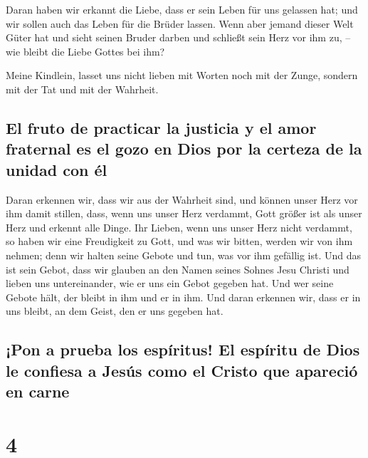  Daran haben wir erkannt die Liebe, dass er sein Leben
für uns gelassen hat; und wir sollen auch das Leben für die Brüder
lassen.  Wenn aber jemand dieser Welt Güter hat und sieht
seinen Bruder darben und schließt sein Herz vor ihm zu, -- wie bleibt
die Liebe Gottes bei ihm?

 Meine Kindlein, lasset uns nicht lieben mit Worten noch
mit der Zunge, sondern mit der Tat und mit der Wahrheit.

\hypertarget{el-fruto-de-practicar-la-justicia-y-el-amor-fraternal-es-el-gozo-en-dios-por-la-certeza-de-la-unidad-con-uxe9l}{%
\subsection{El fruto de practicar la justicia y el amor fraternal es el
gozo en Dios por la certeza de la unidad con
él}\label{el-fruto-de-practicar-la-justicia-y-el-amor-fraternal-es-el-gozo-en-dios-por-la-certeza-de-la-unidad-con-uxe9l}}

 Daran erkennen wir, dass wir aus der Wahrheit sind, und
können unser Herz vor ihm damit stillen,  dass, wenn uns
unser Herz verdammt, Gott größer ist als unser Herz und erkennt alle
Dinge.  Ihr Lieben, wenn uns unser Herz nicht verdammt,
so haben wir eine Freudigkeit zu Gott,  und was wir
bitten, werden wir von ihm nehmen; denn wir halten seine Gebote und tun,
was vor ihm gefällig ist.  Und das ist sein Gebot, dass
wir glauben an den Namen seines Sohnes Jesu Christi und lieben uns
untereinander, wie er uns ein Gebot gegeben hat.  Und wer
seine Gebote hält, der bleibt in ihm und er in ihm. Und daran erkennen
wir, dass er in uns bleibt, an dem Geist, den er uns gegeben hat.

\hypertarget{pon-a-prueba-los-espuxedritus-el-espuxedritu-de-dios-le-confiesa-a-jesuxfas-como-el-cristo-que-apareciuxf3-en-carne}{%
\subsection{¡Pon a prueba los espíritus! El espíritu de Dios le confiesa
a Jesús como el Cristo que apareció en
carne}\label{pon-a-prueba-los-espuxedritus-el-espuxedritu-de-dios-le-confiesa-a-jesuxfas-como-el-cristo-que-apareciuxf3-en-carne}}

\hypertarget{section-3}{%
\section{4}\label{section-3}}

